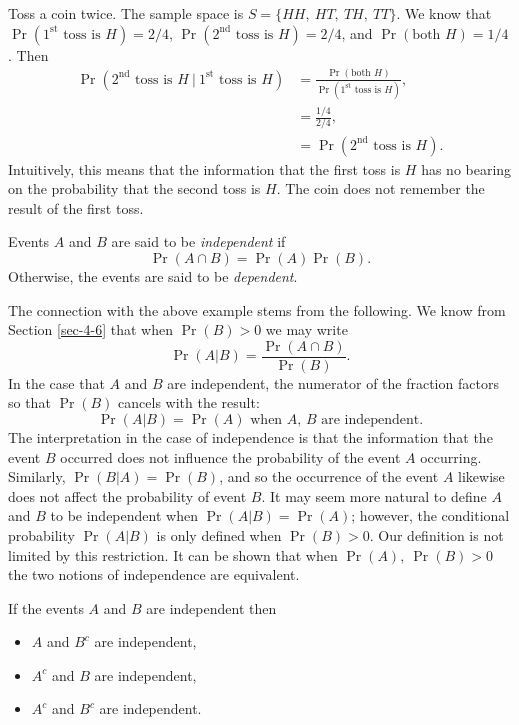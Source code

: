 \documentclass[captions=tableheading]{scrbook}
\begin{document}
Toss a coin twice. The sample space is \(S= \{ HH,\ HT,\ TH,\ TT \} \). We know that \(\Pr(1^{\mathrm{st}}\mbox{ toss is }H)=2/4\), \(\Pr(2^{\mathrm{nd}}\mbox{ toss is }H)=2/4\), and \(\Pr(\mbox{both }H)=1/4\). Then
\begin{align*} \Pr(2^{\mathrm{nd}}\mbox{ toss is }H\ |\ 1^{\mathrm{st}}\mbox{ toss is }H) & =\frac{\Pr(\mbox{both }H)}{\Pr(1^{\mathrm{st}}\mbox{ toss is }H)},\\
 & =\frac{1/4}{2/4},\\
 & =\Pr(2^{\mathrm{nd}}\mbox{ toss is }H).
\end{align*}
Intuitively, this means that the information that the first toss is \(H\) has no bearing on the probability that the second toss is \(H\). The coin does not remember the result of the first toss. 

\begin{defn}
Events \(A\) and \(B\) are said to be \emph{independent} if 
\begin{equation}
\Pr(A\cap B)=\Pr(A)\Pr(B).
\end{equation}
Otherwise, the events are said to be \emph{dependent}. 
\end{defn}

The connection with the above example stems from the following. We know from Section \ref{sec-4-6} that when \(\Pr(B)>0\) we may write
\begin{equation}
\Pr(A|B)=\frac{\Pr(A\cap B)}{\Pr(B)}.
\end{equation}
In the case that \(A\) and \(B\) are independent, the numerator of the fraction factors so that \(\Pr(B)\) cancels with the result:
\begin{equation}
\Pr(A|B)=\Pr(A)\mbox{ when \(A\), \(B\) are independent.}
\end{equation}
The interpretation in the case of independence is that the information that the event \(B\) occurred does not influence the probability of the event \(A\) occurring. Similarly, \(\Pr(B|A)=\Pr(B)\), and so the occurrence of the event \(A\) likewise does not affect the probability of event \(B\). It may seem more natural to define \(A\) and \(B\) to be independent when \(\Pr(A|B)=\Pr(A)\); however, the conditional probability \(\Pr(A|B)\) is only defined when \(\Pr(B)>0\). Our definition is not limited by this restriction. It can be shown that when \(\Pr(A),\ \Pr(B)>0\) the two notions of independence are equivalent.

\begin{prop}
If the events \(A\) and \(B\) are independent then
\begin{itemize}
\item \(A\) and \(B^{c}\) are independent,
\item \(A^{c}\) and \(B\) are independent,
\item \(A^{c}\) and \(B^{c}\) are independent.
\end{itemize}

\end{prop}
\end{document}

